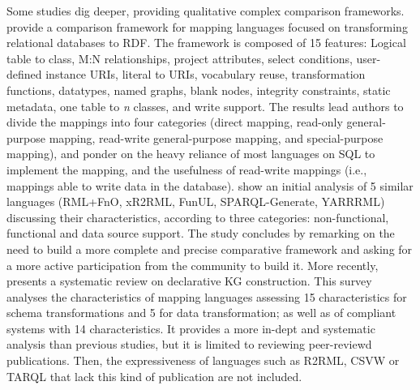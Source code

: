 Some studies dig deeper, providing qualitative complex comparison frameworks. \cite{hert2011comparison} provide a comparison framework for mapping languages focused on transforming relational databases to RDF. The framework is composed of 15 features: Logical table to class, M:N relationships, project attributes, select conditions, user-defined instance URIs, literal to URIs, vocabulary reuse, transformation functions, datatypes, named graphs, blank nodes, integrity constraints, static metadata, one table to \textit{n} classes, and write support. 
The results lead authors to divide the mappings into four categories (direct mapping, read-only general-purpose mapping, read-write general-purpose mapping, and special-purpose mapping), and ponder on the heavy reliance of most languages on SQL to implement the mapping, and the usefulness of read-write mappings (i.e., mappings able to write data in the database). \cite{DeMeester2019comparison} show an initial analysis of 5 similar languages (RML+FnO, xR2RML, FunUL, SPARQL-Generate, YARRRML) discussing their characteristics, according to three categories: non-functional, functional and data source support. The study concludes by remarking on the need to build a more complete and precise comparative framework and asking for a more active participation from the community to build it. 
More recently, \cite{vanassche2023survey} presents a systematic review on declarative KG construction. This survey analyses the characteristics of mapping languages assessing 15 characteristics for schema transformations and 5 for data transformation; as well as of compliant systems with 14 characteristics. It provides a more in-dept and systematic analysis than previous studies, but it is limited to reviewing peer-reviewd publications. Then, the expressiveness of languages such as R2RML, CSVW or TARQL that lack this kind of publication are not included. 